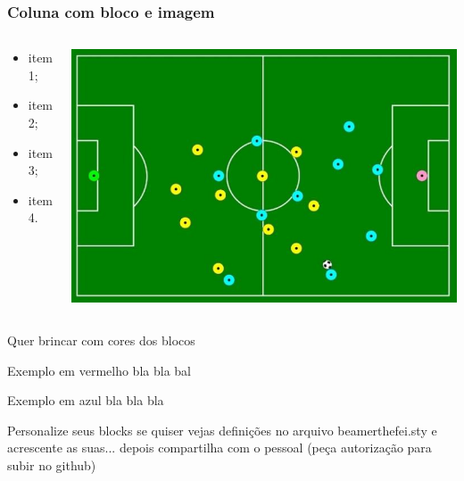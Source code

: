 \documentclass[xcolor=svgnames,8pt]{beamer}
\begin{document}
\begin{frame}
    \frametitle{Coluna com bloco e imagem}
    
    \begin{columns}
        
        \center
        \begin{block}{}
            \begin{itemize}
                \item item 1;
                \item item 2;
                \item item 3;
                \item item 4.
            \end{itemize}     
        \end{block} 
        
        \begin{center}
            \includegraphics[width=1\textwidth]{figuras/pressing_1a.png} 
        \end{center}
    \end{columns}
\end{frame}


\begin{frame}{Quer brincar com cores dos blocos}
    \begin{exemplo_red}{Exemplo em vermelho}
        bla bla bal
    \end{exemplo_red}

    \begin{exemplo_blue}{Exemplo em azul}
        bla bla bla
    \end{exemplo_blue}


    \begin{block}{Personalize seus blocks se quiser}
        vejas definições no arquivo beamerthefei.sty e acrescente as suas...
        depois compartilha com o pessoal (peça autorização para subir no github)
    \end{block}

\end{frame}
   
\end{document}
